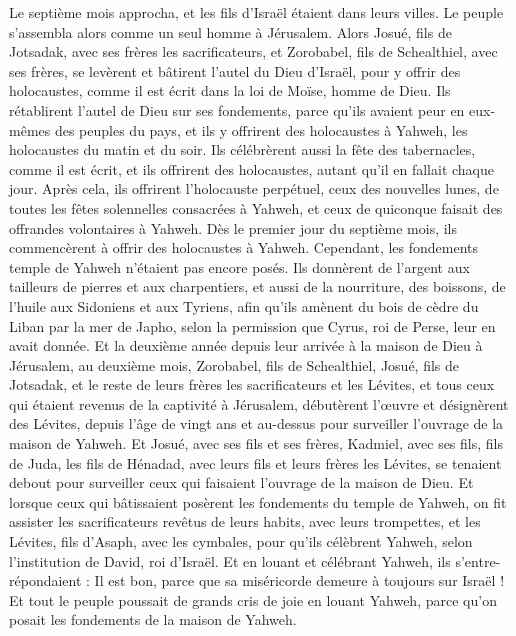 \begin{multicols}{2}
\VerseOne{}Le septième mois approcha, et les fils d'Israël étaient dans leurs villes. Le peuple s'assembla alors comme un seul homme à Jérusalem.
Alors Josué, fils de Jotsadak, avec ses frères les sacrificateurs, et Zorobabel, fils de Schealthiel, avec ses frères, se levèrent et bâtirent l'autel du Dieu d'Israël, pour y offrir des holocaustes, comme il est écrit dans la loi de Moïse, homme de Dieu.
Ils rétablirent l'autel de Dieu sur ses fondements, parce qu'ils avaient peur en eux-mêmes des peuples du pays, et ils y offrirent des holocaustes à Yahweh, les holocaustes du matin et du soir.
Ils célébrèrent aussi la fête des tabernacles, comme il est écrit, et ils offrirent des holocaustes, autant qu'il en fallait  chaque jour.
Après cela, ils offrirent l'holocauste perpétuel, ceux des nouvelles lunes, de toutes les fêtes solennelles consacrées à Yahweh, et ceux de quiconque faisait des offrandes volontaires à Yahweh.
Dès le premier jour du septième mois, ils commencèrent à offrir des holocaustes à Yahweh. Cependant, les fondements temple de Yahweh n'étaient pas encore posés.
Ils donnèrent de l'argent aux tailleurs de pierres et aux charpentiers, et aussi de la nourriture, des boissons, de l'huile aux Sidoniens et aux Tyriens, afin qu'ils amènent du bois de cèdre du Liban par la mer de Japho, selon la permission que Cyrus, roi de Perse, leur en avait donnée.
Et la deuxième année depuis leur arrivée à la maison de Dieu à Jérusalem, au deuxième mois, Zorobabel, fils de Schealthiel,  Josué, fils de Jotsadak, et le reste de leurs frères les sacrificateurs et les Lévites, et tous ceux qui étaient revenus de la captivité à Jérusalem, débutèrent l’œuvre et désignèrent des Lévites, depuis l'âge de vingt ans et au-dessus pour surveiller l'ouvrage de la maison de Yahweh.
Et Josué, avec ses fils et ses frères, Kadmiel, avec ses fils, fils de Juda, les fils de Hénadad, avec leurs fils et leurs frères les Lévites, se tenaient debout pour surveiller ceux qui faisaient l'ouvrage de la maison de Dieu.
Et lorsque ceux qui bâtissaient posèrent les fondements du temple de Yahweh, on fit assister les sacrificateurs revêtus de leurs habits, avec leurs trompettes, et les Lévites, fils d'Asaph, avec les cymbales, pour qu’ils célèbrent Yahweh, selon l’institution de David, roi d'Israël.
Et en louant et célébrant Yahweh, ils s'entre-répondaient : Il est bon, parce que sa miséricorde demeure à toujours sur Israël ! Et tout le peuple poussait de grands cris de joie en louant Yahweh, parce qu'on posait les fondements de la maison de Yahweh.

\end{multicols}
